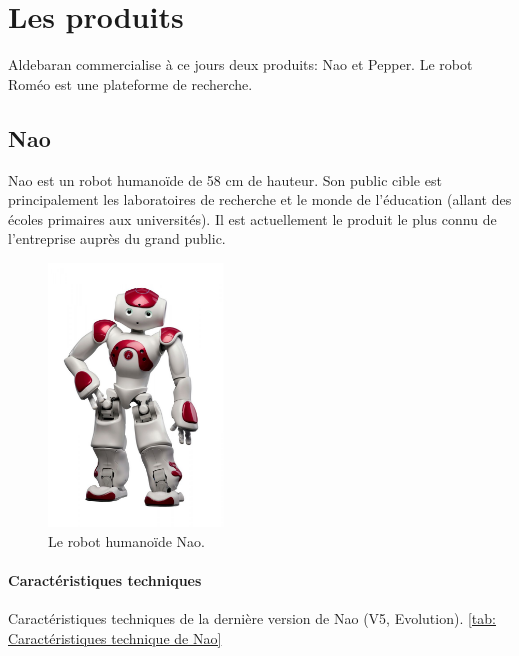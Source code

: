 \section{Les produits}
\label{Entreprise: Les produits}
Aldebaran commercialise à ce jours deux produits: Nao et Pepper. Le robot Roméo est une plateforme de recherche. 

\subsection{Nao}
\label{Entreprise: Les produits: Nao}
Nao est un robot humanoïde de 58 cm de hauteur. Son public cible est principalement les laboratoires de recherche et le monde de l'éducation (allant des écoles primaires aux universités). Il est actuellement le produit le plus connu de l'entreprise auprès du grand public. 

\begin{figure}[h]
	\centering\includegraphics[height=7cm]{images/nao.jpg}
	\caption{Le robot humanoïde Nao.}
	\label{fig:Robot humanoïde Nao}
\end{figure}

\paragraph{Caractéristiques techniques}
\label{Entreprise:Les produits: Nao: Caractéristiques techniques}
Caractéristiques techniques de la dernière version de Nao (V5, Evolution). \ref{tab: Caractéristiques technique de Nao}

